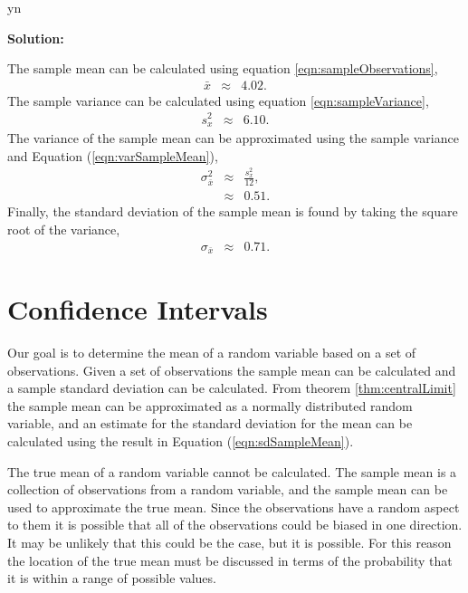 \documentclass[12pt]{article}
\def\solutions{y}
\def\solutions{n}
\begin{document}
\if y\solutions

\textbf{Solution:}

The sample mean can be calculated using equation
\ref{eqn:sampleObservations},
\begin{eqnarray*}
  \bar{x} & \approx & 4.02.
\end{eqnarray*}
The sample variance can be calculated using equation
\ref{eqn:sampleVariance}, 
\begin{eqnarray*}
  s^2_x & \approx & 6.10.
\end{eqnarray*}
The variance of the sample mean can be approximated using the sample
variance and Equation (\ref{eqn:varSampleMean}),
\begin{eqnarray*}
  \sigma^2_{\bar{x}} & \approx & \frac{s^2_x}{12},\\
    & \approx & 0.51.
\end{eqnarray*}
Finally, the standard deviation of the sample mean is found by taking
the square root of the variance,
\begin{eqnarray*}
  \sigma_{\bar{x}} & \approx & 0.71.
\end{eqnarray*}

\fi



\section{Confidence Intervals} 
\label{section:confidenceIntervals}

Our goal is to determine the mean of a random variable based on a set
of observations.  Given a set of observations the sample mean can be
calculated and a sample standard deviation can be calculated. From
theorem \ref{thm:centralLimit} the sample mean can be approximated as
a normally distributed random variable, and an estimate for the
standard deviation for the mean can be calculated using the result in
Equation (\ref{eqn:sdSampleMean}).

The true mean of a random variable cannot be calculated.  The sample
mean is a collection of observations from a random variable, and the
sample mean can be used to approximate the true mean. Since the
observations have a random aspect to them it is possible that all of
the observations could be biased in one direction. It may be unlikely
that this could be the case, but it is possible. For this reason the
location of the true mean must be discussed in terms of the
probability that it is within a range of possible values.
\end{document}
